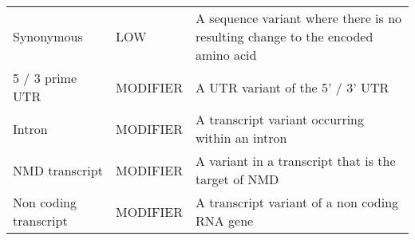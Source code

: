 \documentclass[12pt,twoside]{reedthesis}
\theoremstyle{definition}
\theoremstyle{definition}
\theoremstyle{remark}
\begin{document}
\begin{longtable}[]{@{}lll@{}}
  \begin{minipage}[t]{0.18\columnwidth}\raggedright\strut
  Synonymous\strut
  \end{minipage} & \begin{minipage}[t]{0.11\columnwidth}\raggedright\strut
  LOW\strut
  \end{minipage} & \begin{minipage}[t]{0.63\columnwidth}\raggedright\strut
  A sequence variant where there is no resulting change to the encoded
  amino acid\strut
  \end{minipage}\tabularnewline
  \begin{minipage}[t]{0.18\columnwidth}\raggedright\strut
  5 / 3 prime UTR\strut
  \end{minipage} & \begin{minipage}[t]{0.11\columnwidth}\raggedright\strut
  MODIFIER\strut
  \end{minipage} & \begin{minipage}[t]{0.63\columnwidth}\raggedright\strut
  A UTR variant of the 5' / 3' UTR\strut
  \end{minipage}\tabularnewline
  \begin{minipage}[t]{0.18\columnwidth}\raggedright\strut
  Intron\strut
  \end{minipage} & \begin{minipage}[t]{0.11\columnwidth}\raggedright\strut
  MODIFIER\strut
  \end{minipage} & \begin{minipage}[t]{0.63\columnwidth}\raggedright\strut
  A transcript variant occurring within an intron\strut
  \end{minipage}\tabularnewline
  \begin{minipage}[t]{0.18\columnwidth}\raggedright\strut
  NMD transcript\strut
  \end{minipage} & \begin{minipage}[t]{0.11\columnwidth}\raggedright\strut
  MODIFIER\strut
  \end{minipage} & \begin{minipage}[t]{0.63\columnwidth}\raggedright\strut
  A variant in a transcript that is the target of NMD\strut
  \end{minipage}\tabularnewline
  \begin{minipage}[t]{0.18\columnwidth}\raggedright\strut
  Non coding transcript\strut
  \end{minipage} & \begin{minipage}[t]{0.11\columnwidth}\raggedright\strut
  MODIFIER\strut
  \end{minipage} & \begin{minipage}[t]{0.63\columnwidth}\raggedright\strut
  A transcript variant of a non coding RNA gene\strut
  \end{minipage}\tabularnewline
  \bottomrule
  \end{longtable}
  
\end{document}
